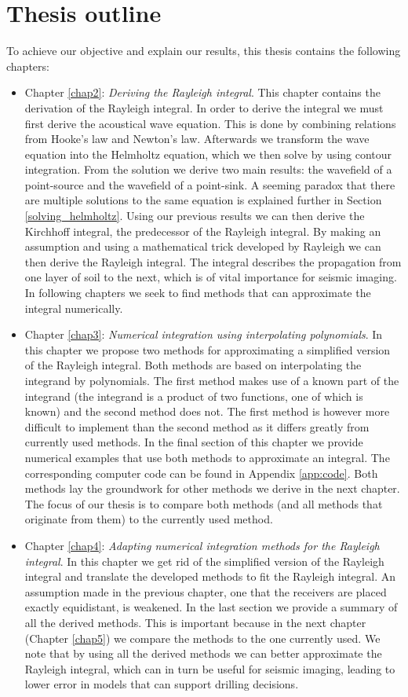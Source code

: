 \section{Thesis outline}
To achieve our objective and explain our results, this thesis contains the following chapters:
\begin{itemize}
    \item Chapter \ref{chap2}: \textsl{Deriving the Rayleigh integral}. This chapter contains the derivation of the Rayleigh integral. In order to derive the integral we must first derive the acoustical wave equation. This is done by combining relations from Hooke's law and Newton's law. Afterwards we transform the wave equation into the Helmholtz equation, which we then solve by using contour integration. From the solution we derive two main results: the wavefield of a point-source and the wavefield of a point-sink. A seeming paradox that there are multiple solutions to the same equation is explained further in Section \ref{solving_helmholtz}. Using our previous results we can then derive the Kirchhoff integral, the predecessor of the Rayleigh integral. By making an assumption and using a mathematical trick developed by Rayleigh we can then derive the Rayleigh integral. The integral describes the propagation from one layer of soil to the next, which is of vital importance for seismic imaging. In following chapters we seek to find methods that can approximate the integral numerically.
    \item Chapter \ref{chap3}: \textsl{Numerical integration using interpolating polynomials}. In this chapter we propose two methods for approximating a simplified version of the Rayleigh integral. Both methods are based on interpolating the integrand by polynomials. The first method makes use of a known part of the integrand (the integrand is a product of two functions, one of which is known) and the second method does not. The first method is however more difficult to implement than the second method as it differs greatly from currently used methods. In the final section of this chapter we provide numerical examples that use both methods to approximate an integral. The corresponding computer code can be found in Appendix \ref{app:code}. Both methods lay the groundwork for other methods we derive in the next chapter. The focus of our thesis is to compare both methods (and all methods that originate from them) to the currently used method.
    \item Chapter \ref{chap4}: \textsl{Adapting numerical integration methods for the Rayleigh integral}. In this chapter we get rid of the simplified version of the Rayleigh integral and translate the developed methods to fit the Rayleigh integral. An assumption made in the previous chapter, one that the receivers are placed exactly equidistant, is weakened. In the last section we provide a summary of all the derived methods. This is important because in the next chapter (Chapter \ref{chap5}) we compare the methods to the one currently used. We note that by using all the derived methods we can better approximate the Rayleigh integral, which can in turn be useful for seismic imaging, leading to lower error in models that can support drilling decisions.

\end{itemize}
